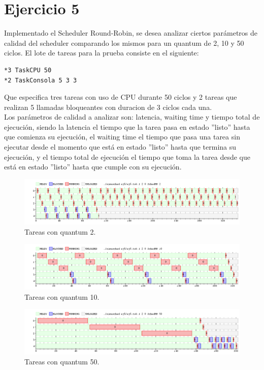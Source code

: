 \section{Ejercicio 5}

Implementado el Scheduler Round-Robin, se desea analizar ciertos parámetros de calidad del scheduler comparando los mismos para un quantum de 2, 10 y 50 ciclos.
El lote de tareas para la prueba consiste en el siguiente:

\begin{verbatim}
*3 TaskCPU 50 
*2 TaskConsola 5 3 3
\end{verbatim}

Que especifica tres tareas con uso de CPU durante 50 ciclos y 2 tareas que realizan 5 llamadas bloqueantes con duracion de 3 ciclos cada una.\\

Los parámetros de calidad a analizar son: latencia, waiting time y tiempo total de ejecución, siendo la latencia el tiempo que la tarea pasa en estado ''listo'' hasta que comienza su ejecución, el waiting time el tiempo que pasa una tarea sin ejecutar desde el momento que está en estado ''listo'' hasta que termina su ejecución, y el tiempo total de ejecución el tiempo que toma la tarea desde que está en estado ''listo'' hasta que cumple con su ejecución.

\begin{figure}[h]
  \includegraphics[width=\textwidth]{../ej5/ej5RR1202.png}
  \caption{Tareas con quantum 2.}
  \label{fig:quant2}
\end{figure}


\begin{figure}[h]
  \includegraphics[width=\textwidth]{../ej5/ej5RR12010.png}
  \caption{Tareas con quantum 10.}
\end{figure}


\begin{figure}[h]
  \includegraphics[width=\textwidth]{../ej5/ej5RR12050.png}
  \caption{Tareas con quantum 50.}
\end{figure}


